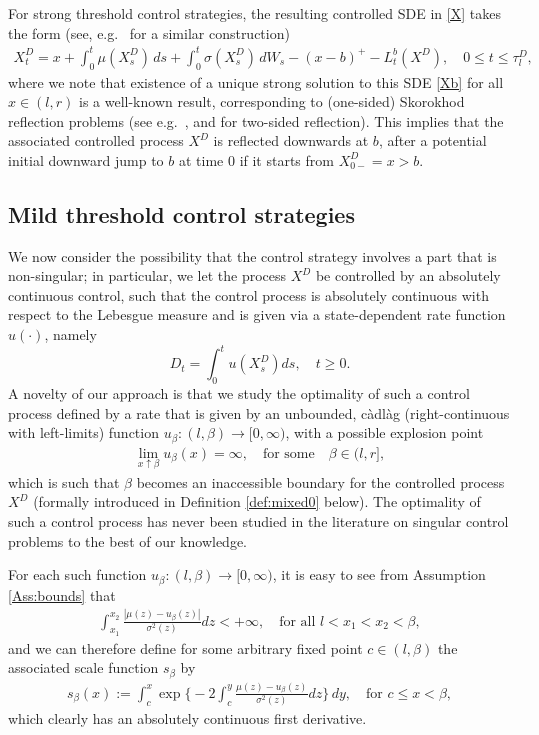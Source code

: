 \documentclass[11pt]{article} %
\numberwithin{komcounter}{section}
\begin{document}
For strong threshold control strategies, the resulting controlled SDE in \eqref{X} takes the form (see, e.g.~\cite{alvarez2001singular} for a similar construction)
\begin{align} \label{Xb}
X_t^{D} = x + \int_0^t \mu(X_s^{D}) \, ds + \int_0^t \sigma(X_s^{D}) \, dW_s - (x-b)^+ - L^b_t(X^{D}), 
\quad  0 \leq t \leq \tau^D_l,
\end{align}
where we note that existence of a unique strong solution to this SDE \eqref{Xb} for all $x \in (l,r)$ is a well-known result, corresponding to (one-sided) Skorokhod reflection problems 
(see e.g.~\cite{pilipenko2014introduction}, and \cite{Chitashvili01121981} for two-sided reflection).
This implies that the associated controlled process $X^D$ is reflected downwards at $b$, after a potential initial downward jump to $b$ at time $0$ if it starts from $X^D_{0-} = x > b$. 




\subsection{Mild threshold control strategies}
\label{sec:mild}

We now consider the possibility that the control strategy involves a part that is non-singular; in particular, we let the process $X^D$ be controlled by an absolutely continuous control, such that the control process is absolutely continuous with respect to the Lebesgue measure and is given via a state-dependent rate function $u(\cdot)$, namely
$$
D_t=\int_0^tu(X^D_s)ds, \quad t \geq 0.
$$ 
A novelty of our approach is that we study the optimality of such a control process defined by a rate that is given by an unbounded, c\`adl\`ag (right-continuous with left-limits) function $u_\beta:(l,\beta) \rightarrow [0,\infty)$, with a possible explosion point
\begin{align*}
\lim_{x \uparrow \beta} u_\beta(x) = \infty, \quad \text{for some} \quad \beta \in (l,r],
\end{align*}
which is such that $\beta$ becomes an inaccessible boundary for the controlled process $X^D$ (formally introduced in Definition \ref{def:mixed0} below). 
The optimality of such a control process has never been studied in the literature on singular control problems to the best of our knowledge. 

For each such function $u_\beta: (l,\beta) \rightarrow [0,\infty)$, it is easy to see from Assumption \ref{Ass:bounds} that 
\begin{align} \label{cond:weak}
\int_{x_1}^{x_2} \frac{|\mu(z) - u_\beta(z)|}{\sigma^2(z)} dz < + \infty,
\quad \text{for all } l<x_1<x_2<\beta,
\end{align}
and we can therefore define for some arbitrary fixed point $c \in (l,\beta)$ the associated scale function $s_\beta$ by 
\begin{align}\label{scale_def}
s_\beta(x) := \int_{c}^{x} \exp \bigg\{ - 2 \int_{c}^{y} \frac{\mu(z) - u_\beta(z)}{\sigma^2(z)} dz \bigg\} \, dy, \quad \text{for } c \leq x < \beta, 
\end{align}
which clearly has an absolutely continuous first derivative. 
\end{document}
